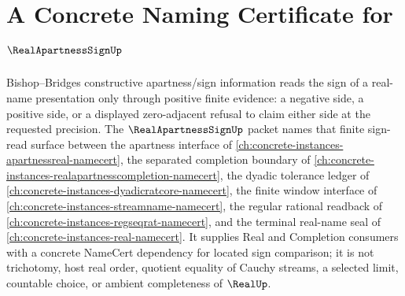 \chapter{A Concrete Naming Certificate for $\RealApartnessSignUp$}
\label{ch:concrete-instances-real-apartness-sign-namecert}

Bishop--Bridges constructive apartness/sign information reads the sign of a real-name presentation only through positive finite evidence: a negative side, a positive side, or a displayed zero-adjacent refusal to claim either side at the requested precision. The $\RealApartnessSignUp$ packet names that finite sign-read surface between the apartness interface of \autoref{ch:concrete-instances-apartnessreal-namecert}, the separated completion boundary of \autoref{ch:concrete-instances-realapartnesscompletion-namecert}, the dyadic tolerance ledger of \autoref{ch:concrete-instances-dyadicratcore-namecert}, the finite window interface of \autoref{ch:concrete-instances-streamname-namecert}, the regular rational readback of \autoref{ch:concrete-instances-regseqrat-namecert}, and the terminal real-name seal of \autoref{ch:concrete-instances-real-namecert}. It supplies Real and Completion consumers with a concrete NameCert dependency for located sign comparison; it is not trichotomy, host real order, quotient equality of Cauchy streams, a selected limit, countable choice, or ambient completeness of $\RealUp$.

